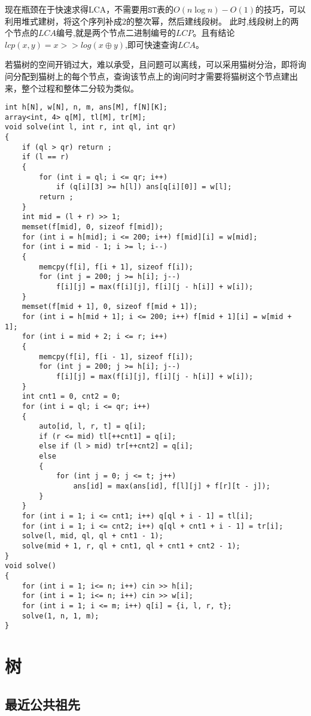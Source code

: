 \documentclass[a4paper, fontset=none]{ctexart}
\begin{document}
现在瓶颈在于快速求得$\text{LCA}$，不需要用$\texttt{ST}$表的$O(n\log n)-O(1)$的技巧，可以利用堆式建树，将这个序列补成$2$的整次幂，然后建线段树。
此时,线段树上的两个节点的$LCA$编号,就是两个节点二进制编号的$LCP$。且有结论$lcp(x, y)=x >> log(x\oplus y)$,即可快速查询$LCA$。

若猫树的空间开销过大，难以承受，且问题可以离线，可以采用猫树分治，即将询问分配到猫树上的每个节点，查询该节点上的询问时才需要将猫树这个节点建出来，整个过程和整体二分较为类似。
\begin{verbatim}
int h[N], w[N], n, m, ans[M], f[N][K];
array<int, 4> q[M], tl[M], tr[M];
void solve(int l, int r, int ql, int qr)
{
    if (ql > qr) return ;
    if (l == r)
    {
        for (int i = ql; i <= qr; i++)
            if (q[i][3] >= h[l]) ans[q[i][0]] = w[l];
        return ;
    }
    int mid = (l + r) >> 1;
    memset(f[mid], 0, sizeof f[mid]);
    for (int i = h[mid]; i <= 200; i++) f[mid][i] = w[mid];
    for (int i = mid - 1; i >= l; i--)
    {
        memcpy(f[i], f[i + 1], sizeof f[i]);
        for (int j = 200; j >= h[i]; j--)
            f[i][j] = max(f[i][j], f[i][j - h[i]] + w[i]);
    }
    memset(f[mid + 1], 0, sizeof f[mid + 1]);
    for (int i = h[mid + 1]; i <= 200; i++) f[mid + 1][i] = w[mid + 1];
    for (int i = mid + 2; i <= r; i++)
    {
        memcpy(f[i], f[i - 1], sizeof f[i]);
        for (int j = 200; j >= h[i]; j--)
            f[i][j] = max(f[i][j], f[i][j - h[i]] + w[i]);
    }
    int cnt1 = 0, cnt2 = 0;
    for (int i = ql; i <= qr; i++)
    {
        auto[id, l, r, t] = q[i];
        if (r <= mid) tl[++cnt1] = q[i];
        else if (l > mid) tr[++cnt2] = q[i];
        else
        {
            for (int j = 0; j <= t; j++)
                ans[id] = max(ans[id], f[l][j] + f[r][t - j]);
        }
    }
    for (int i = 1; i <= cnt1; i++) q[ql + i - 1] = tl[i];
    for (int i = 1; i <= cnt2; i++) q[ql + cnt1 + i - 1] = tr[i];
    solve(l, mid, ql, ql + cnt1 - 1);
    solve(mid + 1, r, ql + cnt1, ql + cnt1 + cnt2 - 1);
}
void solve()
{
    for (int i = 1; i<= n; i++) cin >> h[i];
    for (int i = 1; i<= n; i++) cin >> w[i];
    for (int i = 1; i <= m; i++) q[i] = {i, l, r, t};
    solve(1, n, 1, m);
}
\end{verbatim}

\section{树}
\subsection{最近公共祖先}
\end{document}
